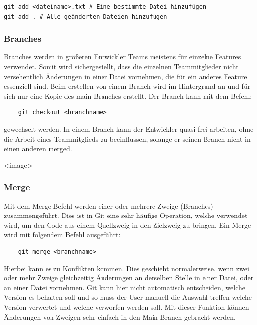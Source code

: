 \begin{verbatim}
git add <dateiname>.txt # Eine bestimmte Datei hinzufügen
git add . # Alle geänderten Dateien hinzufügen
\end{verbatim}

\subsubsection{Branches}

Branches werden in größeren Entwickler Teams meistens für einzelne Features verwendet. Somit wird sichergestellt, dass die einzelnen Teammitglieder nicht versehentlich Änderungen in einer Datei vornehmen, die für ein anderes Feature essenziell sind. Beim erstellen von einem Branch wird im Hintergrund an und für sich nur eine Kopie des main Branches erstellt. Der Branch kann mit dem Befehl: 

\begin{verbatim}
    git checkout <branchname>
\end{verbatim}

gewechselt werden.
In einem Branch kann der Entwickler quasi frei arbeiten, ohne die Arbeit eines Teammitglieds zu beeinflussen, solange er seinen Branch nicht in einen anderen merged.

<image>

\cite{Github_Branches}

\subsubsection{Merge}

Mit dem Merge Befehl werden einer oder mehrere Zweige (Branches) zusammengeführt. Dies ist in Git eine sehr häufige Operation, welche verwendet wird, um den Code aus einem Quellzweig in den Zielzweig zu bringen.
Ein Merge wird mit folgendem Befehl ausgeführt: 

\begin{verbatim}
    git merge <branchname>
\end{verbatim}

Hierbei kann es zu Konflikten kommen. Dies geschieht normalerweise, wenn zwei oder mehr Zweige gleichzeitig Änderungen an derselben Stelle in einer Datei, oder an einer Datei vornehmen. Git kann hier nicht automatisch entscheiden, welche Version es behalten soll und so muss der User manuell die Auswahl treffen welche Version verwertet und welche verworfen werden soll. Mit dieser Funktion können Änderungen von Zweigen sehr einfach in den Main Branch gebracht werden.

